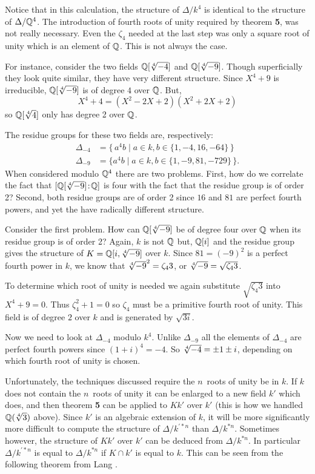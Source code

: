 Notice that in this calculation, the structure of 
$\Delta /k^4$ is identical to the structure of
$\Delta / \mathbb{Q}^4$.  The introduction of fourth roots of unity
required by theorem {\bf 5}, was not really necessary.  Even the
$\zeta_4$ needed at the last step was only a square root of unity which
is an element of $\mathbb{Q}$.  This is not always the case.  

For instance, consider the two fields
$\Q[\root4\of{-4}]$ and $\Q[\root4\of{-9}]$.  Though superficially they
look quite similar, they have very different structure.  Since $X^4+9$
is irreducible, $\Q[\root4\of{-9}]$ is of degree $4$ over $\mathbb{Q}$.  But,
\[
X^4+4 = (X^2 - 2X +2)(X^2 +2X+2)
\]
so $\Q[\root4\of4]$ only has degree 2 over $\mathbb{Q}$.

The residue groups for these two fields are, respectively:
\[
\begin{aligned}
  \Delta_{-4} &= \{\, a^4 b \mid a \in k, b\in \{1, -4, 16, -64\}\,\} \\
  \Delta_{-9} &= \{a^4 b \mid a \in k, b \in \{1, -9, 81, -729\}\,\}.
\end{aligned}
\]
When considered modulo $\mathbb{Q}^4$ there are two problems.  First, how do we
correlate the fact that $\fieldDegree{\Q[\root4\of{-9}]}{\Q}$ is four with the
fact that the residue group is of order 2? Second, both residue groups
are of order 2 since $16$ and $81$ are perfect fourth powers, and yet
the have radically different structure.  

Consider the first problem.  How can $\Q[\root4\of{-9}]$ be of degree
four over $\mathbb{Q}$ when its residue group is of order 2?  Again, $k$ is not
$\mathbb{Q}$ but, $\mathbb{Q}[i]$ and the residue group gives the structure of 
$K = \Q[i, \root4\of{-9}]$ over $k$.  Since $81 = (-9)^2$ is a perfect
fourth power in $k$, we know that $\root4\of{-9}^2 = \zeta_4 3$, or 
$\root4\of{-9} = \sqrt{\zeta_4 3}$.

To determine which root of unity is needed we again substitute
$\sqrt{\zeta_4 3}$ into $X^4+9=0$.  Thus $\zeta_4^2+1=0$ so $\zeta_4$
must be a primitive fourth root of unity.  This field is of degree $2$
over $k$ and is generated by $\sqrt{3i}$.

Now we need to look at $\Delta_{-4}$ modulo $k^4$.  Unlike $\Delta_{-9}$
all the elements of $\Delta_{-4}$ are perfect fourth powers since
$(1+i)^4 = -4$.  So $\root4\of{-4} = \pm 1\pm i$, depending on which
fourth root of unity is chosen. 

Unfortunately, the techniques discussed require the $n$\th\ roots
of unity be in $k$.  If $k$ does not contain the $n$\th\ roots of unity
it can be enlarged to a new field $k'$ which does, and then theorem {\bf
5} can be applied to $Kk'$ over $k'$ (this is how we handled $\Q(\root
4\of 3)$ above).  Since $k'$ is an algebraic
extension of $k$, it will be more significantly more difficult to
compute the structure of $\Delta/k^{\prime \ast n}$ than 
$\Delta/k^{\ast n}$.  Sometimes however, the structure of
$Kk'$ over $k'$ can be deduced from $\Delta/k^{\ast n}$.  In particular
$\Delta/k^{\prime\ast n}$ is equal to $\Delta/k^{\ast n}$ if $K \cap k'$
is equal to $k$.  This can be seen from the following theorem from
Lang \cite{Lang:Algebra}. 

